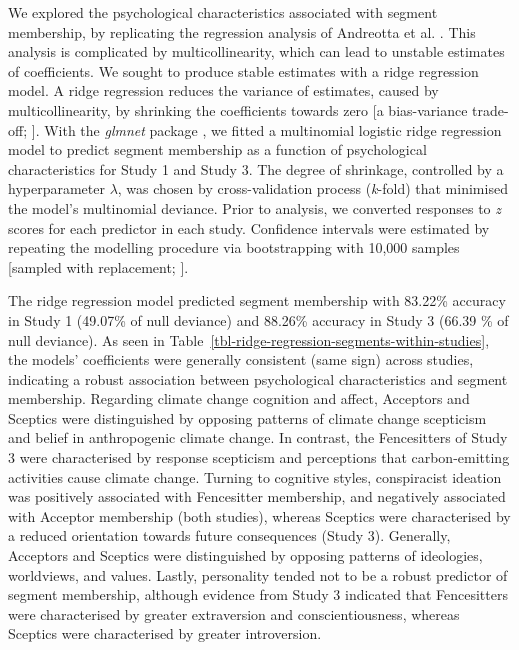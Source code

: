 \documentclass[
  letterpaper,
  DIV=11,
  numbers=noendperiod]{scrartcl}
\begin{document}
We explored the psychological characteristics associated with segment
membership, by replicating the regression analysis of Andreotta et al.
\citeyearpar{andreotta_2022}. This analysis is complicated by
multicollinearity, which can lead to unstable estimates of coefficients.
We sought to produce stable estimates with a ridge regression model. A
ridge regression reduces the variance of estimates, caused by
multicollinearity, by shrinking the coefficients towards zero {[}a
bias-variance trade-off; \citet{james_2021}{]}. With the \emph{glmnet}
package \citep{friedman_2010}, we fitted a multinomial logistic ridge
regression model to predict segment membership as a function of
psychological characteristics for Study 1 and Study 3. The degree of
shrinkage, controlled by a hyperparameter \(\lambda\), was chosen by
cross-validation process (\emph{k}-fold) that minimised the model's
multinomial deviance. Prior to analysis, we converted responses to
\emph{z} scores for each predictor in each study. Confidence intervals
were estimated by repeating the modelling procedure via bootstrapping
with 10,000 samples {[}sampled with replacement; \citet{efron1994}{]}.

The ridge regression model predicted segment membership with 83.22\%
accuracy in Study 1 (49.07\% of null deviance) and 88.26\% accuracy in
Study 3 (66.39 \% of null deviance). As seen in
Table~\ref{tbl-ridge-regression-segments-within-studies}, the models'
coefficients were generally consistent (same sign) across studies,
indicating a robust association between psychological characteristics
and segment membership. Regarding climate change cognition and affect,
Acceptors and Sceptics were distinguished by opposing patterns of
climate change scepticism and belief in anthropogenic climate change. In
contrast, the Fencesitters of Study 3 were characterised by response
scepticism and perceptions that carbon-emitting activities cause climate
change. Turning to cognitive styles, conspiracist ideation was
positively associated with Fencesitter membership, and negatively
associated with Acceptor membership (both studies), whereas Sceptics
were characterised by a reduced orientation towards future consequences
(Study 3). Generally, Acceptors and Sceptics were distinguished by
opposing patterns of ideologies, worldviews, and values. Lastly,
personality tended not to be a robust predictor of segment membership,
although evidence from Study 3 indicated that Fencesitters were
characterised by greater extraversion and conscientiousness, whereas
Sceptics were characterised by greater introversion.
\end{document}
